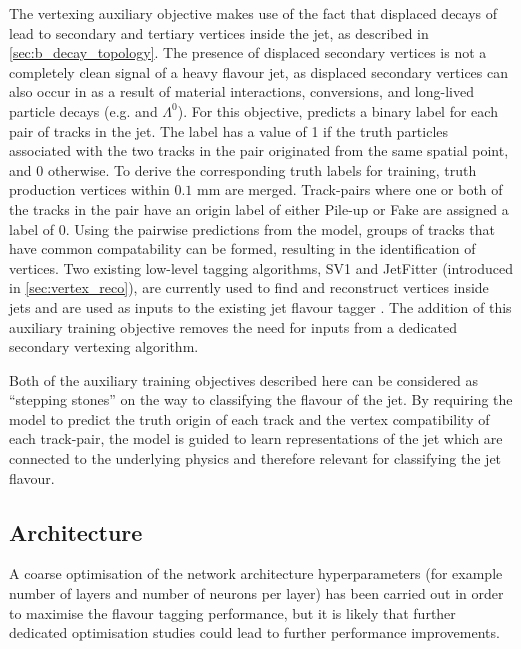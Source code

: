 The vertexing auxiliary objective makes use of the fact that displaced decays of \bchadrons lead to secondary and tertiary vertices inside the jet, as described in \cref{sec:b_decay_topology}.
The presence of displaced secondary vertices is not a completely clean signal of a heavy flavour jet, as displaced secondary vertices can also occur in \ljets as a result of material interactions, conversions, and long-lived particle decays (e.g. \Kshort and $\Lambda^0$).
For this objective, \GNN predicts a binary label for each pair of tracks in the jet.
The label has a value of 1 if the truth particles associated with the two tracks in the pair originated from the same spatial point, and 0 otherwise. 
To derive the corresponding truth labels for training, truth production vertices within $0.1$ mm are merged.%
Track-pairs where one or both of the tracks in the pair have an origin label of either Pile-up or Fake are assigned a label of 0.
Using the pairwise predictions from the model, groups of tracks that have common compatability can be formed, resulting in the identification of vertices.
Two existing low-level tagging algorithms, SV1 and JetFitter (introduced in \cref{sec:vertex_reco}), are currently used to find and reconstruct vertices inside jets and are used as inputs to the existing jet flavour tagger \DLr.
The addition of this auxiliary training objective removes the need for inputs from a dedicated secondary vertexing algorithm.

Both of the auxiliary training objectives described here can be considered as ``stepping stones'' on the way to classifying the flavour of the jet. 
By requiring the model to predict the truth origin of each track and the vertex compatibility of each track-pair, the model is guided to learn representations of the jet which are connected to the underlying physics and therefore relevant for classifying the jet flavour. 


\subsection{Architecture}\label{sec:Architecture}

A coarse optimisation of the network architecture hyperparameters (for example number of layers and number of neurons per layer) has been carried out in order to maximise the flavour tagging performance, but it is likely that further dedicated optimisation studies could lead to further performance improvements. %

